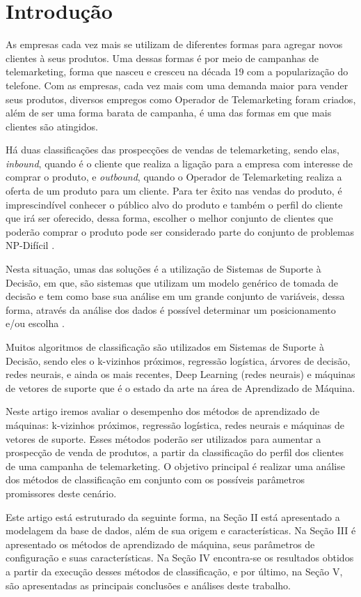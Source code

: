 \section{Introdução}
As empresas cada vez mais se utilizam de diferentes formas para agregar novos clientes à seus produtos. Uma dessas formas é por meio de campanhas de telemarketing, forma que nasceu e cresceu na década 19 com a popularização do telefone. Com as empresas, cada vez mais com uma demanda maior para vender seus produtos, diversos empregos como Operador de Telemarketing foram criados, além de ser uma forma barata de campanha, é uma das formas em que mais clientes são atingidos.

Há duas classificações das prospecções de vendas de telemarketing, sendo elas,  \emph{inbound}, quando é o cliente que realiza a ligação para a empresa com interesse de comprar o produto, e \emph{outbound}, quando o Operador de Telemarketing realiza a oferta de um produto para um cliente. Para ter êxito nas vendas do produto, é imprescindível conhecer o público alvo do produto e também o perfil do cliente que irá ser oferecido, dessa forma, escolher o melhor conjunto de clientes que poderão comprar o produto pode ser considerado parte do conjunto de problemas NP-Difícil \cite{np_dificil}.

Nesta situação, umas das soluções é a utilização de Sistemas de Suporte à Decisão, em que, são sistemas que utilizam um modelo genérico de tomada de decisão e tem como base sua análise em um grande conjunto de variáveis, dessa forma, através da análise dos dados é possível determinar um posicionamento e/ou escolha \cite{administracao_sistemas}.

Muitos algoritmos de classificação são utilizados em Sistemas de Suporte à Decisão, sendo eles o k-vizinhos próximos, regressão logística, árvores de decisão, redes neurais, e ainda os mais recentes, Deep Learning (redes neurais) e máquinas de vetores de suporte que é o estado da arte na área de Aprendizado de Máquina. \cite{rule_extraction}

Neste artigo iremos avaliar o desempenho dos métodos de aprendizado de máquinas: k-vizinhos próximos, regressão logística, redes neurais e máquinas de vetores de suporte. Esses métodos poderão ser utilizados para aumentar a prospecção de venda de produtos, a partir da classificação do perfil dos clientes de uma campanha de telemarketing. O objetivo principal é realizar uma análise dos métodos de classificação em conjunto com os possíveis parâmetros promissores deste cenário.

Este artigo está estruturado da seguinte forma, na Seção II está apresentado a modelagem da base de dados, além de sua origem e características. Na Seção III é apresentado os métodos de aprendizado de máquina, seus parâmetros de configuração e suas características. Na Seção IV encontra-se os resultados obtidos a partir da execução desses métodos de classificação, e por último, na Seção V, são apresentadas as principais conclusões e análises deste trabalho.
